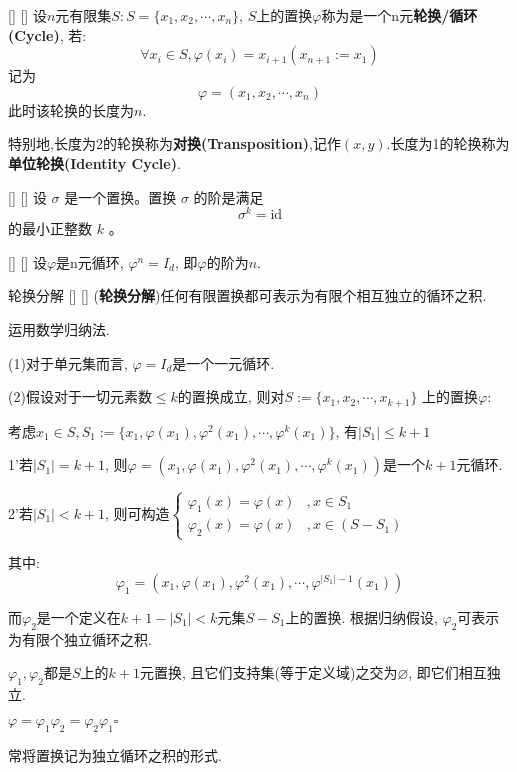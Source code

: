 \documentclass[UTF8]{ctexart}
\begin{document}
		\begin{dfn}
            []
            {}
            []
            []
			设$n$元有限集$S: S=\{x_1,x_2,\cdots,x_n\}$, $S$上的置换$\varphi$称为是一个n元\textbf{轮换/循环(Cycle)}, 若: 
			\[\forall x_i\in S, \varphi(x_i)=x_{i+1}(x_{n+1}:=x_1)\]记为
			\[\varphi=(x_1,x_2,\cdots,x_n)\]
            此时该轮换的长度为$n$.

            特别地,长度为2的轮换称为\textbf{对换(Transposition)},记作$(x,y)$.长度为1的轮换称为\textbf{单位轮换(Identity Cycle)}.
		\end{dfn}

        \begin{dfn}
            []
            {}
            []
            []
            设 \(\sigma\) 是一个置换。置换 \(\sigma\) 的阶是满足
            \[
            \sigma^k = \text{id}
            \]
            的最小正整数 \(k\) 。
       \end{dfn}
		
		\begin{ppt}
            []
            {}
            []
            []
			设$\varphi$是n元循环, $\varphi^n=I_d$, 即$\varphi$的阶为$n$.
		\end{ppt}
		
		\begin{ppt}
            []
            {轮换分解}
            []
            []
			(\textbf{轮换分解})任何有限置换都可表示为有限个相互独立的循环之积. 
		\end{ppt}

        \begin{prf} 
		
			运用数学归纳法. 
			
			(1)对于单元集而言, $\varphi=I_d$是一个一元循环. 
			
			(2)假设对于一切元素数$\leq k$的置换成立, 则对$S:=\{x_1,x_2,\cdots,x_{k+1}\}$ 上的置换$\varphi$: 
			
			考虑$x_1\in S, S_1:=\{x_1,\varphi(x_1),\varphi^2(x_1),\cdots,\varphi^k(x_1)\}$, 有$|S_1|\leq k+1$
			
			1'若$|S_1|=k+1$, 则$\varphi=(x_1,\varphi(x_1),\varphi^2(x_1),\cdots,\varphi^k(x_1))$是一个$k+1$元循环. 
			
			2'若$|S_1|<k+1$, 则可构造$\begin{cases}
			\varphi_1(x)=\varphi(x) & , x\in S_1\\
			\varphi_2(x)=\varphi(x) & , x\in (S-S_1)
			\end{cases}$
			
			其中: 
			\[\varphi_1=(x_1,\varphi(x_1),\varphi^2(x_1),\cdots,\varphi^{|S_1|-1}(x_1))\]
			
			而$\varphi_2$是一个定义在$k+1-|S_1|<k$元集$S-S_1$上的置换. 根据归纳假设, $\varphi_2$可表示为有限个独立循环之积. 
			
			$\varphi_1,\varphi_2$都是$S$上的$k+1$元置换, 且它们支持集(等于定义域)之交为$\varnothing$, 即它们相互独立. 
			
			$\varphi=\varphi_1\varphi_2=\varphi_2\varphi_1\square$
			
		常将置换记为独立循环之积的形式. 
	\end{prf}
\end{document}
